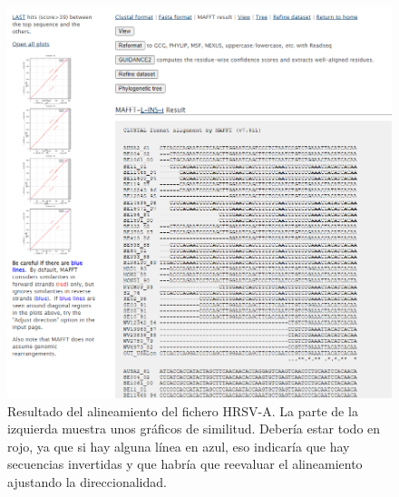 \begin{figure}
\centering
\includegraphics[width = \linewidth]{figs/mafft-result.png}
\caption{Resultado del alineamiento del fichero HRSV-A. La parte de la izquierda muestra unos gráficos de similitud. Debería estar todo en rojo, ya que si hay alguna línea en azul, eso indicaría que hay secuencias invertidas y que habría que reevaluar el alineamiento ajustando la direccionalidad.}
\label{fig:mafft-result}
\end{figure}

